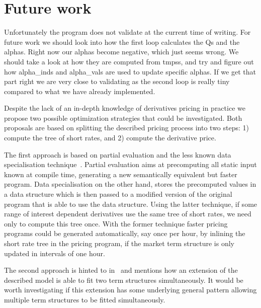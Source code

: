 \section{Future work}

Unfortunately the program does not validate at the current
time of writing. For future work we should look into how
the first loop calculates the Qs and the alphas.
Right now our alphas become negative, which just seems wrong.
We should take a look at how they are computed from tmpss,
and try and figure out how alpha\_inds and alpha\_vals are
used to update specific alphas. If we get that part right
we are very close to validating as the second loop is really
tiny compared to what we have already implemented.

Despite the lack of an in-depth knowledge of derivatives
pricing in practice we propose two possible optimization
strategies that could be investigated. Both proposals are
based on splitting the described pricing process into two
steps: 1) compute the tree of short rates, and 2) compute
the derivative price.

The first approach is based on partial evaluation and the
less known data specialisation
technique~\cite{malmkjaer,chirokoff}. Partial evaluation
aims at precomputing all static input known at compile time,
generating a new semantically equivalent but faster
program. Data specialisation on the other hand, stores the
precomputed values in a data structure which is then passed
to a modified version of the original program that is able
to use the data structure. Using the latter technique, if some
range of interest dependent derivatives use the same tree of
short rates, we need only to compute this tree once. With
the former technique faster pricing programs could be
generated automatically, say once per hour, by inlining the
short rate tree in the pricing program, if the market term
structure is only updated in intervals of one hour.

The second approach is hinted to in~\cite{HullWhite94} and
mentions how an extension of the described model is able to
fit two term structures simultaneously. It would be worth
investigating if this extension has some underlying general
pattern allowing multiple term structures to be fitted
simultaneously.

